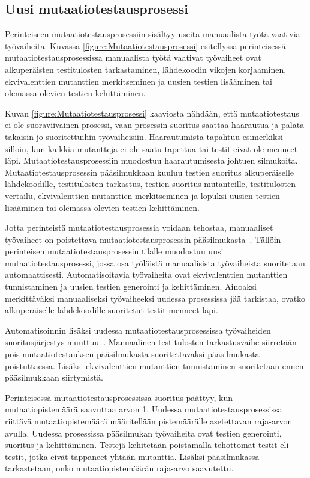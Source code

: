 \documentclass[finnish, grading]{tktltiki2}
\theoremstyle{definition}
\theoremstyle{remark}
\begin{document}
\subsection{Uusi mutaatiotestausprosessi}

Perinteiseen mutaatiotestausprosessiin sisältyy useita manuaalista työtä vaativia työvaiheita. Kuvassa \ref{figure:Mutaatiotestausprosessi} esitellyssä perinteisessä mutaatiotestausprosessissa manuaalista työtä vaativat työvaiheet ovat alkuperäisten testitulosten tarkastaminen, lähdekoodin vikojen korjaaminen, ekvivalenttien mutanttien merkitseminen ja uusien testien lisääminen tai olemassa olevien testien kehittäminen. 

Kuvan \ref{figure:Mutaatiotestausprosessi} kaaviosta nähdään, että mutaatiotestaus ei ole suoraviivainen prosessi, vaan prosessin suoritus saattaa haarautua ja palata takaisin jo suoritettuihin työvaiheisiin. Haarautumista tapahtuu esimerkiksi silloin, kun kaikkia mutantteja ei ole saatu tapettua tai testit eivät ole menneet läpi. Mutaatiotestausprosessiin muodostuu haarautumisesta johtuen silmukoita. Mutaatiotestausprosessin pääsilmukkaan kuuluu testien suoritus alkuperäiselle lähdekoodille, testitulosten tarkastus, testien suoritus mutanteille, testitulosten vertailu, ekvivalenttien mutanttien merkitseminen ja lopuksi uusien testien lisääminen tai olemassa olevien testien kehittäminen.

Jotta perinteistä mutaatiotestausprosessia voidaan tehostaa, manuaaliset työvaiheet on poistettava mutaatiotestausprosessin pääsilmukasta~\cite[s. 41]{Offutt:Untch:2001}. Tällöin perinteisen mutaatiotestausprosessin tilalle muodostuu uusi mutaatiotestausprosessi, jossa osa työläistä manuaalisista työvaiheista suoritetaan automaattisesti. Automatisoitavia työvaiheita ovat ekvivalenttien mutanttien tunnistaminen ja uusien testien generointi ja kehittäminen. Ainoaksi merkittäväksi manuaaliseksi työvaiheeksi uudessa prosessissa jää tarkistaa, ovatko alkuperäiselle lähdekoodille suoritetut testit menneet läpi.

Automatisoinnin lisäksi uudessa mutaatiotestausprosessissa työvaiheiden suoritusjärjestys muuttuu~\cite[s. 40]{Offutt:Untch:2001}. Manuaalinen testitulosten tarkastusvaihe siirretään pois mutaatiotestauksen pääsilmukasta suoritettavaksi pääsilmukasta poistuttaessa. Lisäksi ekvivalenttien mutanttien tunnistaminen suoritetaan ennen pääsilmukkaan siirtymistä. 

Perinteisessä mutaatiotestausprosessissa suoritus päättyy, kun mutaatiopistemäärä saavuttaa arvon 1. Uudessa mutaatiotestausprosessissa riittävä mutaatiopistemäärä määritellään pistemäärälle asetettavan raja-arvon avulla. Uudessa prosessissa pääsilmukan työvaiheita ovat testien generointi, suoritus ja kehittäminen. Testejä kehitetään poistamalla tehottomat testit eli testit, jotka eivät tappaneet yhtään mutanttia. Lisäksi pääsilmukassa tarkastetaan, onko mutaatiopistemäärän raja-arvo saavutettu. 
\end{document}
